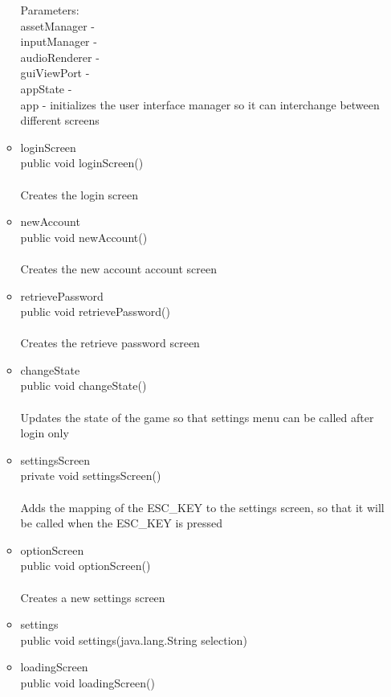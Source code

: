 \documentclass[letterpaper]{article}
\begin{document}
\begin{itemize}
\begin{itemize}
											Parameters: \\
											assetManager - \\
											inputManager - \\
											audioRenderer - \\
											guiViewPort - \\
											appState - \\
											app - initializes the user interface manager so it can interchange between different screens
									\item	loginScreen \\
											public void loginScreen() \\ \\
											Creates the login screen	
									\item	newAccount \\
											public void newAccount() \\ \\
											Creates the new account account screen
									\item	retrievePassword \\
											public void retrievePassword() \\ \\
											Creates the retrieve password screen
									\item	changeState \\
											public void changeState() \\ \\
											Updates the state of the game so that settings menu can be called after login only
									\item	settingsScreen \\
											private void settingsScreen() \\ \\
											Adds the mapping of the ESC\_KEY to the settings screen, so that it will be called when the ESC\_KEY is pressed
									\item	optionScreen \\
											public void optionScreen() \\ \\
											Creates a new settings screen
									\item	settings \\
											public void settings(java.lang.String selection)
									\item	loadingScreen \\
											public void loadingScreen() \\ \\

\end{itemize}
\end{itemize}
\end{document}
